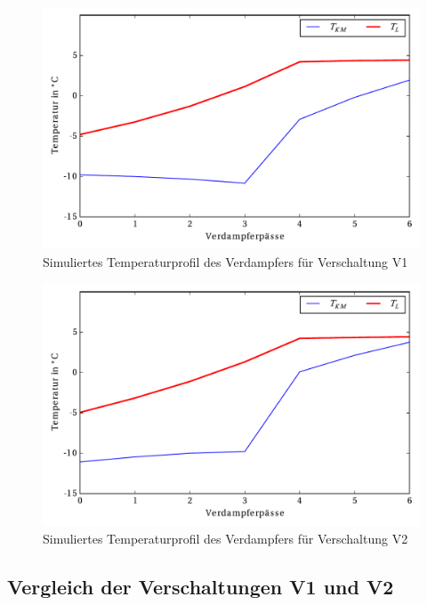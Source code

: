 \begin{figure}[h!]
\centering
\includegraphics[scale=0.8]{Pictures/Temp_V11.pdf}
\caption{Simuliertes Temperaturprofil des Verdampfers für Verschaltung V1}
\label{fig:SimTempV1}
\end{figure}

\begin{figure}[h!]
\centering
\includegraphics[scale=0.8]{Pictures/Temp_V21.pdf}
\caption{Simuliertes Temperaturprofil des Verdampfers für Verschaltung V2}
\label{fig:SimTempV2}
\end{figure}
\subsection{Vergleich der Verschaltungen V1 und V2}
\label{subsec:Vergleich der Verschaltungen V1 und V2}

